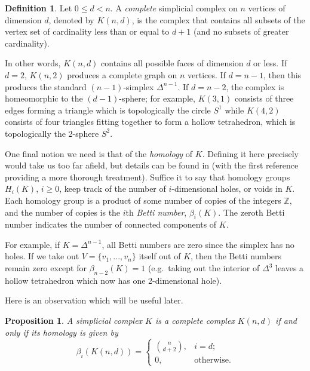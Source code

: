 \documentclass[11pt]{amsart}
\newcommand{\Z}{{\mathbb Z}}
\theoremstyle{plain}
\newtheorem{prop}[thm]{Proposition}
\theoremstyle{definition}
\newtheorem{defin}[thm]{Definition}
\theoremstyle{remark}
\begin{document}
\begin{defin}\label{D:Complete} Let $0\leq d< n$. 
A \emph{complete} simplicial complex on $n$ vertices of dimension $d$, denoted by $K(n,d)$, is the complex that contains all subsets of the vertex set of cardinality less than or equal to $d+1$ (and no subsets of greater cardinality).
\end{defin}
In other words, $K(n,d)$ contains all possible faces of dimension $d$ or less. 
If $d=2$, $K(n,2)$ produces a complete graph on $n$ vertices. If $d=n-1$, then this produces the standard $(n-1)$-simplex $\Delta^{n-1}$. If $d=n-2$, the complex is homeomorphic to the $(d-1)$-sphere; for example, $K(3,1)$ consists of three edges forming a triangle which is topologically the circle $S^1$ while $K(4,2)$ consists of four triangles fitting together to form a  hollow tetrahedron, which is topologically the 2-sphere $S^2$.

One final notion we need is that of the \emph{homology} of $K$. Defining it here precisely would take us too far afield, but details can be found in \cite{MV:Politics, VV:SimpleGames} (with the first reference providing a more thorough treatment). Suffice it to say that homology groups $H_i(K)$, $i\geq 0$, keep track of the number of $i$-dimensional holes, or voids in $K$. Each homology group is a product of some number of copies of the integers $\Z$, and the number of copies is the $i$th \emph{Betti number}, $\beta_i(K)$. The zeroth Betti number indicates the number of connected components of $K$.

For example, if $K=\Delta^{n-1}$, all Betti numbers are zero since the simplex has no holes. If we take out $V=\{v_1, ..., v_n\}$ itself out of $K$, then the Betti numbers remain zero except for $\beta_{n-2}(K)=1$ (e.g.~taking out the interior of $\Delta^3$ leaves a hollow tetrahedron which now has one 2-dimensional hole). 

Here is an observation which will be useful later.

\begin{prop}\label{P:CompleteHomology}
A simplicial complex $K$ is a complete complex $K(n,d)$ if and only if its homology is given by
$$
\beta_i (K(n,d)) =
\begin{cases}
{n \choose d+2}, & i=d ;\\
0, & \text{otherwise}.
\end{cases}
$$

\end{prop}
\end{document}
